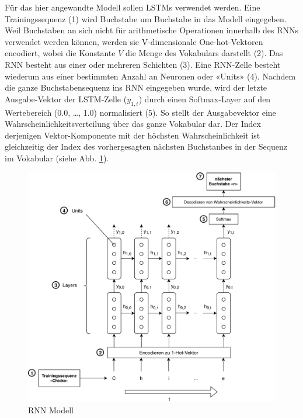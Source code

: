 Für das hier angewandte Modell sollen LSTMs verwendet werden.
Eine Trainingssequenz (1) wird Buchstabe um Buchstabe in das Modell eingegeben.
Weil Buchstaben an sich nicht für arithmetische Operationen innerhalb des RNNs verwendet werden können, werden sie V-dimensionale One-hot-Vektoren encodiert, wobei die Konstante $ V $ die Menge des Vokabulars darstellt (2).
Das RNN besteht aus einer oder mehreren Schichten (3).
Eine RNN-Zelle besteht wiederum aus einer bestimmten Anzahl an Neuronen oder «Units» (4).
Nachdem die ganze Buchstabensequenz ins RNN eingegeben wurde, wird der letzte Ausgabe-Vektor der LSTM-Zelle ($ y_{1,t} $) durch einen Softmax-Layer auf den Wertebereich (0.0, …, 1.0) normalisiert (5).
So stellt der Ausgabevektor eine Wahrscheinlichkeitsverteilung über das ganze Vokabular dar.
Der Index derjenigen Vektor-Komponente mit der höchsten Wahrscheinlichkeit ist gleichzeitig der Index des vorhergesagten nächsten Buchstanbes in der Sequenz im Vokabular (siehe Abb. \ref{fig:rnn-model-definition}).

\begin{figure}
    \centering
    \includegraphics[width=0.9\linewidth]{images/diagrams/model.pdf}
    \caption{RNN Modell}
    \label{fig:rnn-model-definition}
\end{figure}

